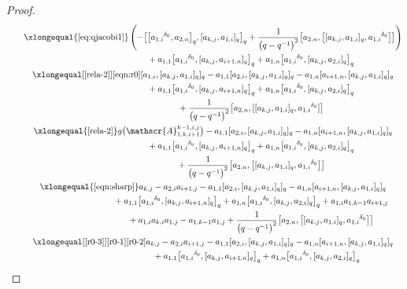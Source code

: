 \documentclass[pdftex]{sigma}
\numberwithin{equation}{section}
\def\d{\delta}
\def\A{\mathscr{A}}
\begin{document}
\begin{proof}
\begin{gather*}
\qquad \xlongequal{\eqref{eq:qjacobi1}} \left(- \bigl[ \bigl[{a_{1,i}}^{\d_0},a_{2,n} \bigr]_q, [a_{k,j},a_{1,i} ]_q \bigr]_q+\frac{1}{ \bigl(q-q^{-1}\bigr)^2} \bigl[a_{2,n}, \bigl[ [a_{k,j},a_{1,i} ]_q, {a_{1,i}}^{\d_0} \bigr] \bigr] \right)\\
 \phantom{\qquad \xlongequal{\qquad}}{} +a_{1,1} \bigl[{a_{1,i}}^{\d_0}, [a_{k,j},a_{i+1,n} ]_q \bigr]_q +a_{1,n} \bigl[{a_{1,i}}^{\d_0}, [a_{k,j},a_{2,i} ]_q \bigr]_q\\
\qquad \xlongequal[\eqref{rela-2}]{\eqref{eqn:r0}} [a_{1,i}, [a_{k,j},a_{1,i} ]_q ]_q-a_{1,1} [a_{2,i}, [a_{k,j},a_{1,i} ]_q ]_q -a_{1,n} [a_{i+1,n}, [a_{k,j},a_{1,i} ]_q ]_q \\
 \phantom{\qquad \xlongequal{\qquad}}{} +a_{1,1} \bigl[{a_{1,i}}^{\d_0}, [a_{k,j},a_{i+1,n} ]_q \bigr]_q+a_{1,n} \bigl[{a_{1,i}}^{\d_0}, [a_{k,j},a_{2,i} ]_q \bigr]_q \\
 \phantom{\qquad \xlongequal{\qquad}}{} +\frac{1}{ \bigl(q-q^{-1}\bigr)^2} \bigl[a_{2,n}, [ [a_{k,j},a_{1,i} ]_q, {a_{1,i}}^{\d_0} ] \bigr]\\
 \qquad\xlongequal{\eqref{rela-2}} g\bigl(\A_{1,k,i+1}^{k-1,i,j}\bigr)-a_{1,1} [a_{2,i}, [a_{k,j},a_{1,i} ]_q ]_q -a_{1,n} [a_{i+1,n}, [a_{k,j},a_{1,i} ]_q ]_q \\
 \phantom{\qquad \xlongequal{\qquad}}{} +a_{1,1} \bigl[{a_{1,i}}^{\d_0}, [a_{k,j},a_{i+1,n} ]_q \bigr]_q +a_{1,n} \bigl[{a_{1,i}}^{\d_0}, [a_{k,j},a_{2,i} ]_q \bigr]_q\\
 \phantom{\qquad \xlongequal{\qquad}}{} +\frac{1}{ \bigl(q-q^{-1}\bigr)^2} \bigl[a_{2,n}, \bigl[ [a_{k,j},a_{1,i} ]_q, {a_{1,i}}^{\d_0} \bigr] \bigr]\\
\qquad \xlongequal{\eqref{eqn:sharp}} a_{k,j}-a_{2,i}a_{i+1,j} -a_{1,1} [a_{2,i}, [a_{k,j},a_{1,i} ]_q ]_q -a_{1,n} [a_{i+1,n}, [a_{k,j},a_{1,i} ]_q ]_q \\
 \phantom{\qquad \xlongequal{\qquad}}{} +a_{1,1} \bigl[{a_{1,i}}^{\d_0}, [a_{k,j},a_{i+1,n} ]_q \bigr]_q +a_{1,n} \bigl[{a_{1,i}}^{\d_0}, [a_{k,j},a_{2,i} ]_q \bigr]_q+a_{1,i}a_{1,k-1}a_{i+1,j}\\
 \phantom{\qquad \xlongequal{\qquad}}{} +a_{1,i}a_{k,i}a_{1,j} -a_{1,k-1}a_{1,j}+\frac{1}{ \bigl(q-q^{-1}\bigr)^2} \bigl[a_{2,n}, \bigl[ [a_{k,j},a_{1,i} ]_q, {a_{1,i}}^{\d_0} \bigr] \bigr]\\
 \qquad\xlongequal[\eqref{r0-3}]{\eqref{r0-1}\eqref{r0-2} } a_{k,j}-a_{2,i}a_{i+1,j} -a_{1,1} [a_{2,i}, [a_{k,j},a_{1,i} ]_q ]_q -a_{1,n} [a_{i+1,n}, [a_{k,j},a_{1,i} ]_q ]_q \\
 \phantom{\qquad \xlongequal{\qquad}\quad\ }{} +a_{1,1} \bigl[{a_{1,i}}^{\d_0}, [a_{k,j},a_{i+1,n} ]_q \bigr]_q +a_{1,n} \bigl[{a_{1,i}}^{\d_0}, [a_{k,j},a_{2,i} ]_q \bigr]_q \\

\end{gather*}
\end{proof}
\end{document}
